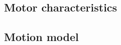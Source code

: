 \documentclass[Main]{subfiles}
\begin{document}

	\subsection{Motor characteristics} %
		\label{sub:motor_characteristics}
		

	\subsection{Motion model} %
		\label{sub:motion_model}
		

\end{document}
